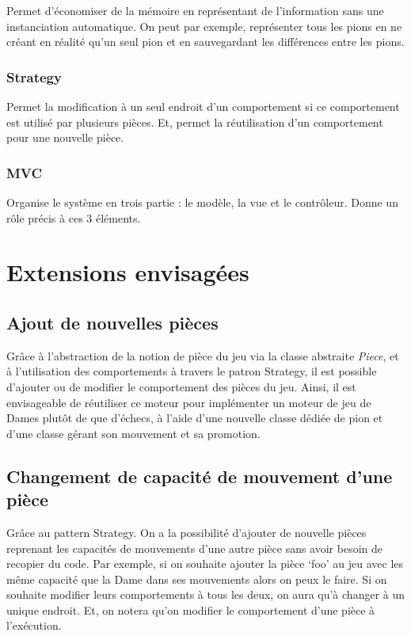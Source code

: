 \documentclass[11pt]{article}
\begin{document}
    Permet d'économiser de la mémoire en représentant de l'information sans une instanciation automatique. On peut par exemple, représenter tous les pions en ne créant en réalité qu'un seul pion et en sauvegardant les différences entre les pions.
\subsubsection{Strategy}
\label{sec-3-3-4}

    Permet la modification à un seul endroit d'un comportement si ce comportement est utilisé par plusieurs pièces. Et, permet la réutilisation d'un comportement pour une nouvelle pièce.
\subsubsection{MVC}
\label{sec-3-3-5}

    Organise le système en trois partie : le modèle, la vue et le contrôleur.
    Donne un rôle précis à ces 3 éléments.
\section{Extensions envisagées}
\label{sec-4}
\subsection{Ajout de nouvelles pièces}
\label{sec-4-1}
Grâce à l'abstraction de la notion de pièce du jeu via la classe abstraite \emph{Piece}, et à l'utilisation des comportements à travers le patron Strategy, il est possible d'ajouter ou de modifier le comportement des pièces du jeu. Ainsi, il est envisageable de réutiliser ce moteur pour implémenter un moteur de jeu de Dames plutôt de que d'échecs, à l'aide d'une nouvelle classe dédiée de pion et d'une classe gérant son mouvement et sa promotion.
\subsection{Changement de capacité de mouvement d'une pièce}
\label{sec-4-2}

   Grâce au pattern Strategy.
   On a la possibilité d'ajouter de nouvelle pièces reprenant les capacités de mouvements d'une autre pièce sans avoir besoin de recopier du code.
   Par exemple, si on souhaite ajouter la pièce `foo' au jeu avec les même capacité que la Dame dans ses mouvements alors on peux le faire. Si on souhaite modifier leurs comportements à tous les deux, on aura qu'à changer à un unique endroit. Et, on notera qu'on modifier le comportement d'une pièce à l'exécution.
\end{document}

